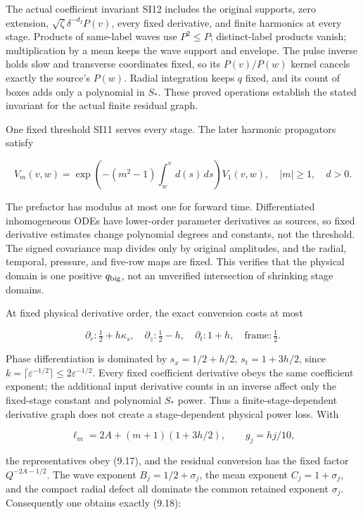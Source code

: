 \documentclass[10pt,a4paper]{article}
\begin{document}
The actual coefficient invariant SI12 includes the original supports, zero extension, \(\sqrt\zeta\delta^{-d_I}P(v)\), every fixed derivative, and finite harmonics at every stage. Products of same-label waves use \(P^2\le P\); distinct-label products vanish; multiplication by a mean keeps the wave support and envelope. The pulse inverse holds slow and transverse coordinates fixed, so its \(P(v)/P(w)\) kernel cancels exactly the source's \(P(w)\). Radial integration keeps \(q\) fixed, and its count of boxes adds only a polynomial in \(S_*\). These proved operations establish the stated invariant for the actual finite residual graph.

One fixed threshold SI11 serves every stage. The later harmonic propagators satisfy

\[
V_m(v,w)=
\exp\!\left(-(m^2-1)\int_w^v d(s)\,ds\right)V_1(v,w),
\quad |m|\ge1,\quad d>0.
\]

The prefactor has modulus at most one for forward time. Differentiated inhomogeneous ODEs have lower-order parameter derivatives as sources, so fixed derivative estimates change polynomial degrees and constants, not the threshold. The signed covariance map divides only by original amplitudes, and the radial, temporal, pressure, and five-row maps are fixed. This verifies that the physical domain is one positive \(q_{\rm big}\), not an unverified intersection of shrinking stage domains.

At fixed physical derivative order, the exact conversion costs at most

\[
\partial_r:\tfrac12+h\kappa_s,\quad
\partial_z:\tfrac12-h,\quad
\partial_t:1+h,\quad
\text{frame}:\tfrac12.
\]

Phase differentiation is dominated by \(s_x=1/2+h/2\), \(s_t=1+3h/2\), since \(k=\lceil\varepsilon^{-1/2}\rceil\le2\varepsilon^{-1/2}\). Every fixed coefficient derivative obeys the same coefficient exponent; the additional input derivative counts in an inverse affect only the fixed-stage constant and polynomial \(S_*\) power. Thus a finite-stage-dependent derivative graph does not create a stage-dependent physical power loss. With

\[
\ell_m=2A+(m+1)(1+3h/2),\qquad g_j=hj/10,
\]

the representatives obey (9.17), and the residual conversion has the fixed factor \(Q^{-2A-1/2}\). The wave exponent \(B_j=1/2+\sigma_j\), the mean exponent \(C_j=1+\sigma_j\), and the compact radial defect all dominate the common retained exponent \(\sigma_j\). Consequently one obtains exactly (9.18):
\end{document}
